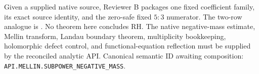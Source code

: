 \begin{theorem}
\label{thm:B-fixed-native-input}
Given a supplied native source, Reviewer B packages one fixed coefficient
family, its exact source identity, and the zero-safe fixed \(5{:}3\) numerator.
The two-row analogue is
.
\notready
No theorem here concludes RH.  The native negative-mass estimate, Mellin
transform, Landau boundary theorem, multiplicity bookkeeping, holomorphic
defect control, and functional-equation reflection must be supplied by the
reconciled analytic API.
Canonical semantic ID awaiting composition:
\texttt{API.MELLIN.SUBPOWER\_NEGATIVE\_MASS}.
\end{theorem}
